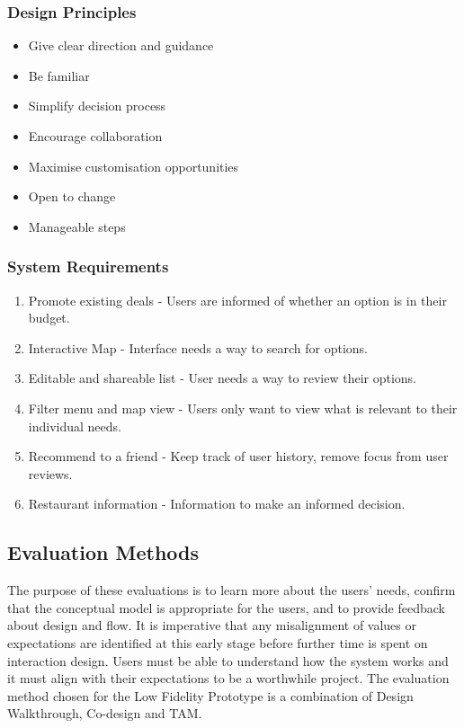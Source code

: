 \documentclass[a4 paper, 12pt]{article}
\begin{document}
        \subsubsection*{Design Principles}
        \begin{multicols}{2}    
            \begin{itemize}
                \item Give clear direction and guidance
                \item Be familiar
                \item Simplify decision process
                \item Encourage collaboration
                \item Maximise customisation opportunities
                \item Open to change
                \item Manageable steps
            \end{itemize}
        \end{multicols}

        \subsubsection*{System Requirements}
            \begin{enumerate}
                \item Promote existing deals - Users are informed of whether an option is in their budget.
                \item Interactive Map - Interface needs a way to search for options.
                \item Editable and shareable list - User needs a way to review their options.
                \item Filter menu and map view - Users only want to view what is relevant to their individual needs.
                \item Recommend to a friend - Keep track of user history, remove focus from user reviews.      
                \item Restaurant information - Information to make an informed decision.
            \end{enumerate}   

\subsection{Evaluation Methods}
The purpose of these evaluations is to learn more about the users' needs, confirm that the conceptual model is appropriate for the users, and to provide feedback about design and flow. It is imperative that any misalignment of values or expectations are identified at this early stage before further time is spent on interaction design. Users must be able to understand how the system works and it must align with their expectations to be a worthwhile project. The evaluation method chosen for the Low Fidelity Prototype is a combination of Design Walkthrough, Co-design and TAM.
\end{document}
